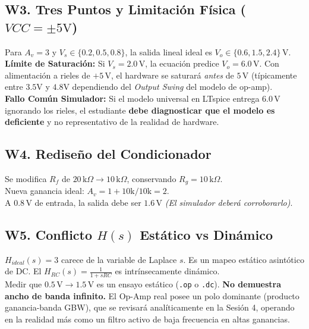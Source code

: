 \documentclass[11pt, a4paper]{article}
\begin{document}
\subsection*{W3. Tres Puntos y Limitación Física ($VCC = \pm5\text{V}$)}
Para $A_v = 3$ y $V_s \in \{0.2, 0.5, 0.8\}$, la salida lineal ideal es $V_o \in \{0.6, 1.5, 2.4\}\,\text{V}$. \\
\textbf{Límite de Saturación:} Si $V_s = 2.0\,\text{V}$, la ecuación predice $V_o = 6.0\,\text{V}$. Con alimentación a rieles de $+5\,\text{V}$, el hardware se saturará \textit{antes} de $5\,\text{V}$ (típicamente entre $3.5\text{V}$ y $4.8\text{V}$ dependiendo del \textit{Output Swing} del modelo de op-amp). \\
\textbf{Fallo Común Simulador:} Si el modelo universal en LTspice entrega $6.0\,\text{V}$ ignorando los rieles, el estudiante \textbf{debe diagnosticar que el modelo es deficiente} y no representativo de la realidad de hardware.

\subsection*{W4. Rediseño del Condicionador}
Se modifica $R_f$ de $20\,\text{k}\Omega \to 10\,\text{k}\Omega$, conservando $R_g = 10\,\text{k}\Omega$. \\
Nueva ganancia ideal: $A_v = 1 + 10\text{k}/10\text{k} = 2$. \\
A $0.8\,\text{V}$ de entrada, la salida debe ser $1.6\,\text{V}$ \textit{(El simulador deberá corroborarlo)}.

\subsection*{W5. Conflicto $H(s)$ Estático vs Dinámico}
$H_{ideal}(s) = 3$ carece de la variable de Laplace $s$. Es un mapeo estático asintótico de DC. El $H_{RC}(s) = \frac{1}{1+sRC}$ es intrínsecamente dinámico. \\
Medir que $0.5\,\text{V} \to 1.5\,\text{V}$ es un ensayo estático (\texttt{.op} o \texttt{.dc}). \textbf{No demuestra ancho de banda infinito.} El Op-Amp real posee un polo dominante (producto ganancia-banda GBW), que se revisará analíticamente en la Sesión 4, operando en la realidad más como un filtro activo de baja frecuencia en altas ganancias.
\end{document}
